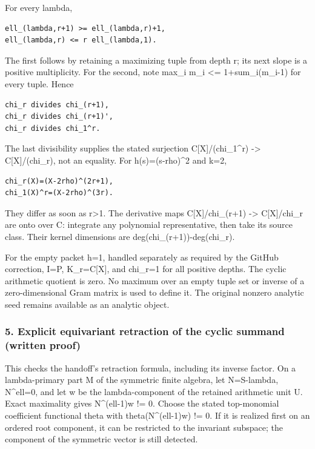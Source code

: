 For every lambda,

\begin{verbatim}
ell_(lambda,r+1) >= ell_(lambda,r)+1,
ell_(lambda,r) <= r ell_(lambda,1).
\end{verbatim}

The first follows by retaining a maximizing tuple from depth r; its next slope is a positive
multiplicity. For the second, note max\_i m\_i \textless= 1+sum\_i(m\_i-1) for every tuple. Hence

\begin{verbatim}
chi_r divides chi_(r+1),
chi_r divides chi_(r+1)',
chi_r divides chi_1^r.
\end{verbatim}

The last divisibility supplies the stated surjection C{[}X{]}/(chi\_1\^{}r) -\textgreater{}
C{[}X{]}/(chi\_r), not an equality. For h(s)=(s-rho)\^{}2 and k=2,

\begin{verbatim}
chi_r(X)=(X-2rho)^(2r+1),
chi_1(X)^r=(X-2rho)^(3r).
\end{verbatim}

They differ as soon as r\textgreater1. The derivative maps C{[}X{]}/chi\_(r+1) -\textgreater{}
C{[}X{]}/chi\_r are onto over C: integrate any polynomial representative, then take its source
class. Their kernel dimensions are deg(chi\_(r+1))-deg(chi\_r).

For the empty packet h=1, handled separately as required by the GitHub correction, I=P,
K\_r=C{[}X{]}, and chi\_r=1 for all positive depths. The cyclic arithmetic quotient is zero. No
maximum over an empty tuple set or inverse of a zero-dimensional Gram matrix is used to define it.
The original nonzero analytic seed remains available as an analytic object.

\subsubsection{5. Explicit equivariant retraction of the cyclic summand (written
proof)}\label{conormal_cyclic_pr21:explicit-equivariant-retraction-of-the-cyclic-summand-written-proof}

This checks the handoff's retraction formula, including its inverse factor. On a lambda-primary part
M of the symmetric finite algebra, let N=S-lambda, N\^{}ell=0, and let w be the lambda-component of
the retained arithmetic unit U. Exact maximality gives N\^{}(ell-1)w != 0. Choose the stated
top-monomial coefficient functional theta with theta(N\^{}(ell-1)w) != 0. If it is realized first on
an ordered root component, it can be restricted to the invariant subspace; the component of the
symmetric vector is still detected.

